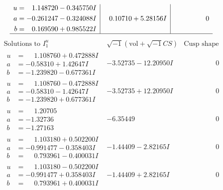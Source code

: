\documentclass[1p]{elsarticle_modified}
\theoremstyle{definition}
\newcommand{\I}{\sqrt{-1}}
\begin{document}
$$\begin{array}{c|c|c}
\begin{aligned}
u &= \phantom{-}1.148720 - 0.345750 I \\
a &= -0.261247 - 0.324088 I \\
b &= \phantom{-}0.169590 + 0.985522 I\end{aligned}
 & \phantom{-}0.10710 + 5.28156 I & \phantom{-0.000000 } 0\\
 \hline 
 \end{array}$$\newpage$$\begin{array}{c|c|c}  
\text{Solutions to }I^u_{1}& \I (\text{vol} + \sqrt{-1}CS) & \text{Cusp shape}\\
 \hline 
\begin{aligned}
u &= \phantom{-}1.108760 + 0.472888 I \\
a &= -0.58310 + 1.42647 I \\
b &= -1.239820 - 0.677361 I\end{aligned}
 & -3.52735 - 12.20950 I & \phantom{-0.000000 } 0 \\ \hline\begin{aligned}
u &= \phantom{-}1.108760 - 0.472888 I \\
a &= -0.58310 - 1.42647 I \\
b &= -1.239820 + 0.677361 I\end{aligned}
 & -3.52735 + 12.20950 I & \phantom{-0.000000 } 0 \\ \hline\begin{aligned}
u &= \phantom{-}1.20705\phantom{ +0.000000I} \\
a &= -1.32736\phantom{ +0.000000I} \\
b &= -1.27163\phantom{ +0.000000I}\end{aligned}
 & -6.35449\phantom{ +0.000000I} & \phantom{-0.000000 } 0 \\ \hline\begin{aligned}
u &= \phantom{-}1.103180 + 0.502200 I \\
a &= -0.991477 - 0.358403 I \\
b &= \phantom{-}0.793961 - 0.400031 I\end{aligned}
 & -1.44409 - 2.82165 I & \phantom{-0.000000 } 0 \\ \hline\begin{aligned}
u &= \phantom{-}1.103180 - 0.502200 I \\
a &= -0.991477 + 0.358403 I \\
b &= \phantom{-}0.793961 + 0.400031 I\end{aligned}
 & -1.44409 + 2.82165 I & \phantom{-0.000000 } 0 \\ \hline\begin{aligned}

\end{aligned}
\end{array}$$
\end{document}
